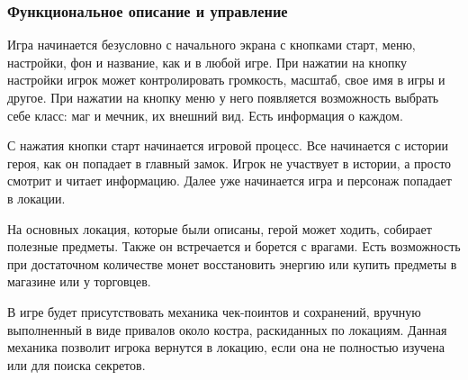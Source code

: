 \documentclass{article}
\begin{document}
\subsubsection{Функциональное описание и управление}
Игра начинается безусловно с начального экрана с кнопками старт, меню, настройки, фон и название, как и в любой игре. При нажатии на кнопку настройки игрок может контролировать громкость, масштаб, свое имя в игры и другое. При нажатии на кнопку меню у него появляется возможность выбрать себе класс: маг и мечник, их внешний вид. Есть информация о каждом. 
\par С нажатия кнопки старт начинается игровой процесс. Все начинается с истории героя, как он попадает в главный замок. Игрок не участвует в истории, а просто смотрит и читает информацию. Далее уже начинается игра и персонаж попадает в локации.
\par На основных локация, которые были описаны, герой может ходить, собирает полезные предметы. Также он встречается и борется с врагами. Есть возможность при достаточном количестве монет восстановить энергию или купить предметы в магазине или у торговцев. 
\par В игре будет присутствовать механика чек-поинтов и сохранений, вручную выполненный в виде привалов около костра, раскиданных по локациям. Данная механика позволит игрока вернутся в локацию, если она не полностью изучена или для поиска секретов.
\end{document}
